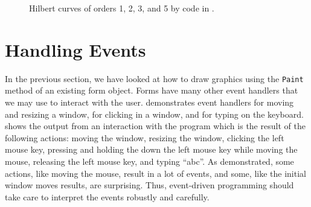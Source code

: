 \documentclass[fsharpnotes.tex]{subfiles}
\begin{document}
\begin{figure}
  \caption{Hilbert curves of orders 1, 2, 3, and 5 by code in .}
  \label{fig:hilbert}
\end{figure}
\clearpage %

\section{Handling Events}
In the previous section, we have looked at how to draw graphics using the \lstinline!Paint! method of an existing form object. Forms have many other event handlers that we may use to interact with the user.  demonstrates event handlers for moving and resizing a window, for clicking in a window, and for typing on the keyboard. 
%
%
%
 shows the output from an interaction with the program which is the result of the following actions: moving the window, resizing the window, clicking the left mouse key, pressing and holding the down the left mouse key while moving the mouse, releasing the left mouse key, and typing ``abc''. As demonstrated, some actions, like moving the mouse, result in a lot of events, and some, like the initial window moves results, are surprising. Thus, event-driven programming should take care to interpret the events robustly and carefully.
\end{document}

